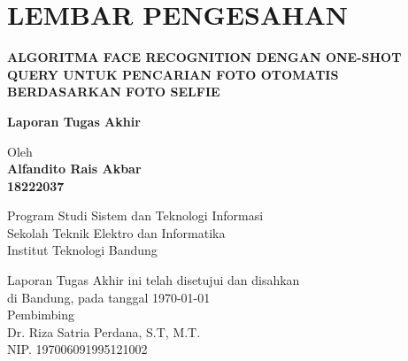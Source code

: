 \chapter*{LEMBAR PENGESAHAN}


\begin{center}
    \vspace{2cm}
  {\large\bfseries ALGORITMA FACE RECOGNITION DENGAN ONE-SHOT QUERY UNTUK PENCARIAN FOTO OTOMATIS BERDASARKAN FOTO SELFIE}\\
     \vspace{2cm}

  {\Large \textbf{Laporan Tugas Akhir}}\\


  \vspace{1.5cm}
    
    
  {\large Oleh}\\[0.3cm]
    \textbf{
    {\large Alfandito Rais Akbar}\\
    {\large 18222037}
  }\\
    
  \vspace{0.5cm}
 
  {\large Program Studi Sistem dan Teknologi Informasi}\\
  {\large Sekolah Teknik Elektro dan Informatika}\\
  {\large Institut Teknologi Bandung}\\

  \vspace{1.5cm}

  Laporan Tugas Akhir ini telah disetujui dan disahkan\\ 
  di Bandung, pada tanggal \today\\[1cm]

	Pembimbing  \\[3cm]
	Dr. Riza Satria Perdana, S.T, M.T.   \\[0.2cm]
	NIP. 197006091995121002 

\end{center}

\vspace{1cm}
\noindent



